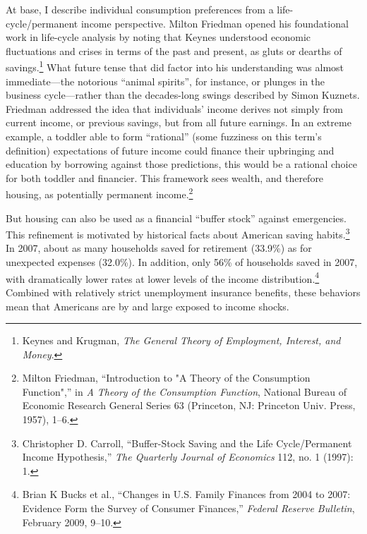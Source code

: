 \documentclass[12pt,oneside]{psthesis}
\begin{document}
At base, I describe individual consumption preferences from a life-cycle/permanent income perspective.
Milton Friedman opened his foundational work in life-cycle analysis by noting that Keynes understood economic fluctuations and crises in terms of the past and present, as gluts or dearths of savings.\footnote{Keynes and Krugman, \emph{The General Theory of Employment, Interest, and Money}.}
What future tense that did factor into his understanding was almost immediate---the notorious ``animal spirits'', for instance, or plunges in the business cycle---rather than the decades-long swings described by Simon Kuznets.
Friedman addressed the idea that individuals' income derives not simply from current income, or previous savings, but from all future earnings.
In an extreme example, a toddler able to form ``rational'' (some fuzziness on this term's definition) expectations of future income could finance their upbringing and education by borrowing against those predictions, this would be a rational choice for both toddler and financier.
This framework sees wealth, and therefore housing, as potentially permanent income.\footnote{Milton Friedman, ``Introduction to "A Theory of the Consumption Function",'' in \emph{A Theory of the Consumption Function}, National Bureau of Economic Research General Series 63 (Princeton, NJ: Princeton Univ. Press, 1957), 1--6.}

But housing can also be used as a financial ``buffer stock'' against emergencies.
This refinement is motivated by historical facts about American saving habits.\footnote{Christopher D. Carroll, ``Buffer-Stock Saving and the Life Cycle/Permanent Income Hypothesis,'' \emph{The Quarterly Journal of Economics} 112, no. 1 (1997): 1.}
In 2007, about as many households saved for retirement (33.9\%) as for unexpected expenses (32.0\%).
In addition, only 56\% of households saved in 2007, with dramatically lower rates at lower levels of the income distribution.\footnote{Brian K Bucks et al., ``Changes in U.S. Family Finances from 2004 to 2007: Evidence Form the Survey of Consumer Finances,'' \emph{Federal Reserve Bulletin}, February 2009, 9--10.}
Combined with relatively strict unemployment insurance benefits, these behaviors mean that Americans are by and large exposed to income shocks.
\end{document}
